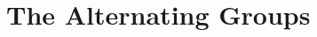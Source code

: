 \documentclass[a4paper,11pt]{article}
\def\maintitle#1{\section*{#1}}
\begin{document}
\else %
    \def\maintitle#1{\section{#1}}
\fi


\maintitle{The Alternating Groups}


% 

\def\ChapTwoSecSix{Chapter 2 section 6 is defined.}


\def\ChapTwoSecSeven{}


\def\ChapTwoSecEight{}


\ifx\ChapTwo\undefined %
     
\end{document}
